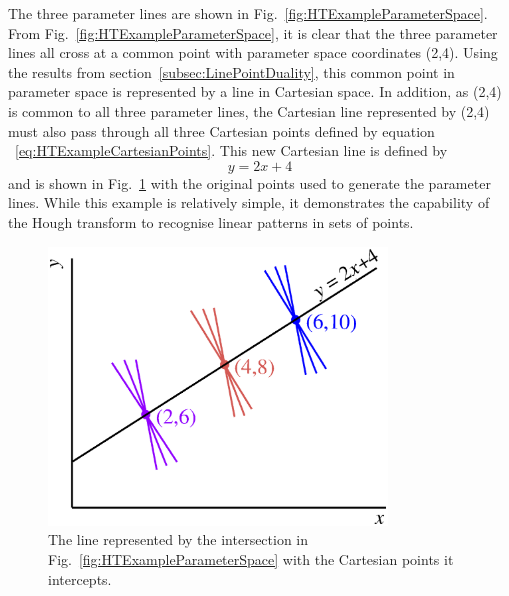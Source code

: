 The three parameter lines are shown in Fig.~\ref{fig:HTExampleParameterSpace}.  From Fig.~\ref{fig:HTExampleParameterSpace}, it is clear that the three parameter lines all cross at a common point with parameter space coordinates (2,4).  Using the results from section~\ref{subsec:LinePointDuality}, this common point in parameter space is represented by a line in Cartesian space.  In addition, as (2,4) is common to all three parameter lines, the Cartesian line represented by (2,4) must also pass through all three Cartesian points defined by equation ~\ref{eq:HTExampleCartesianPoints}.  This new Cartesian line is defined by
\begin{equation}
  y = 2x + 4
  \label{eq:HTExampleCartesianLine}
\end{equation}
and is shown in Fig.~\ref{fig:HTExampleCartesianSpaceWithLine} with the original points used to generate the parameter lines.  While this example is relatively simple, it demonstrates the capability of the Hough transform to recognise linear patterns in sets of points.

\begin{figure}
  \centering
  \includegraphics[width=9cm]{images/hough_transform/HT_example_cartesian_space_with_line}
  \caption{The line represented by the intersection in Fig.~\ref{fig:HTExampleParameterSpace} with the Cartesian points it intercepts.}
  \label{fig:HTExampleCartesianSpaceWithLine}
\end{figure}

